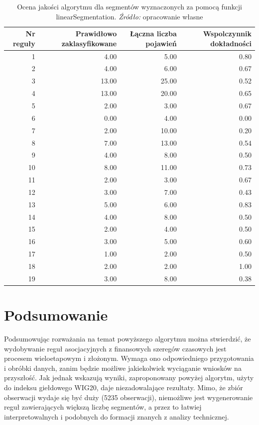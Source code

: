 \documentclass[polish, twoside, 12pt, a4paper]{article}
\theoremstyle{definition}
\theoremstyle{plain}
\theoremstyle{remark}
\begin{document}
\begin{table}[H]
\caption{Ocena jakości algorytmu dla segmentów wyznaczonych za pomocą funkcji linearSegmentation. \textit{Źródło:} opracowanie własne}
\label{tab008}
\begin{tabular}{rrrr}
Nr reguły & Prawidłowo zaklasyfikowane & Łączna liczba pojawień & Wspolczynnik dokładności \\ 
  \hline
1 & 4.00 & 5.00 & 0.80 \\ 
 2 & 4.00 & 6.00 & 0.67 \\ 
 3 & 13.00 & 25.00 & 0.52 \\ 
 4 & 13.00 & 20.00 & 0.65 \\ 
 5 & 2.00 & 3.00 & 0.67 \\ 
 6 & 0.00 & 4.00 & 0.00 \\ 
 7 & 2.00 & 10.00 & 0.20 \\ 
 8 & 7.00 & 13.00 & 0.54 \\ 
 9 & 4.00 & 8.00 & 0.50 \\ 
 10 & 8.00 & 11.00 & 0.73 \\ 
 11 & 2.00 & 3.00 & 0.67 \\ 
 12 & 3.00 & 7.00 & 0.43 \\ 
 13 & 5.00 & 6.00 & 0.83 \\ 
 14 & 4.00 & 8.00 & 0.50 \\ 
 15 & 2.00 & 4.00 & 0.50 \\ 
 16 & 3.00 & 5.00 & 0.60 \\ 
 17 & 1.00 & 2.00 & 0.50 \\ 
 18 & 2.00 & 2.00 & 1.00 \\ 
 19 & 3.00 & 8.00 & 0.38
\end{tabular}
\end{table}

\clearpage
\section{Podsumowanie}

Podsumowując rozważania na temat powyższego algorytmu można stwierdzić, że wydobywanie reguł asocjacyjnych z finansowych szeregów czasowych jest procesem 
wieloetapowym i złożonym. Wymaga ono odpowiedniego przygotowania i obróbki danych, zanim będzie możliwe jakiekolwiek wyciąganie wniosków na przyszłość. Jak jednak 
wskazują wyniki, zaproponowany powyżej algorytm, użyty do indeksu giełdowego WIG20, daje niezadowalające rezultaty. Mimo, że zbiór obserwacji wydaje się być duży (5235 obserwacji), 
niemożliwe jest wygenerowanie reguł zawierających większą liczbę segmentów, a przez to łatwiej interpretowalnych i podobnych do formacji znanych z analizy technicznej.
\end{document}
